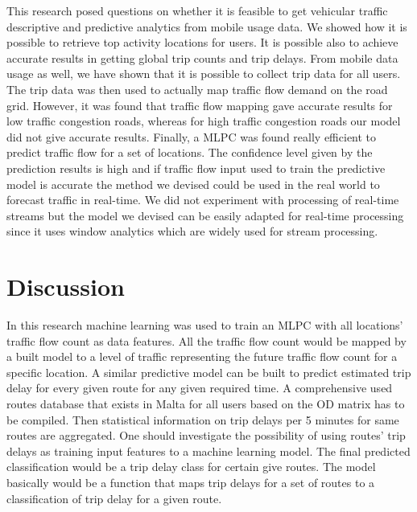 \documentclass[12pt, a4paper]{report}
\theoremstyle{definition}
\theoremstyle{definition}%
\theoremstyle{definition}%
\theoremstyle{definition}%
\theoremstyle{definition}%
\theoremstyle{definition}%
\begin{document}
This research posed questions on whether it is feasible to get vehicular traffic descriptive and predictive analytics from mobile usage data. We showed how it is possible to retrieve top activity locations for users. It is possible also to achieve accurate results in getting global trip counts and trip delays. From mobile data usage as well, we have shown that it is possible to collect trip data for all users. The trip data was then used to actually map traffic flow demand on the road grid. However, it was found that traffic flow mapping gave accurate results for low traffic congestion roads, whereas for high traffic congestion roads our model did not give accurate results. Finally, a MLPC was found really efficient to predict traffic flow for a set of locations. The confidence level given by the prediction results is high and if traffic flow input used to train the predictive model is accurate the method we devised could be used in the real world to forecast traffic in real-time. We did not experiment with processing of real-time streams but the model we devised can be easily adapted for real-time processing since it uses window analytics which are widely used for stream processing.


\section{Discussion} \label{discussion}

In this research machine learning was used to train an MLPC with all locations' traffic flow count as data features. All the traffic flow count would be mapped by a built model to a level of traffic representing the future traffic flow count for a specific location. A similar predictive model can be built to predict estimated trip delay for every given route for any given required time. A comprehensive used routes database that exists in Malta for all users based on the OD matrix has to be compiled. Then statistical information on trip delays per 5 minutes for same routes are aggregated. One should investigate the possibility of using routes' trip delays as training input features to a machine learning model. The final predicted classification would be a trip delay class for certain give routes. The model basically would be a function that maps trip delays for a set of routes to a classification of trip delay for a given route.
\end{document}
